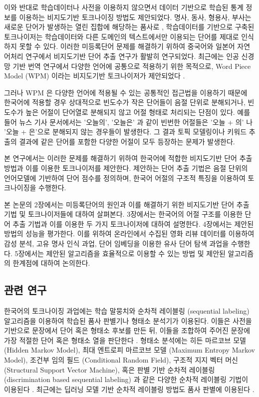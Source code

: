 \documentclass[11pt]{article}
\begin{document}
이와 반대로 학습데이터나 사전을 이용하지 않으면서 데이터 기반으로 학습된 통계 정보를 이용하는 비지도기반 토크나이징 방법도 제안되었다.
명사, 동사, 형용사, 부사는 새로운 단어가 발생하는 열린 집합에 해당하는 품사로 \citep{jurafsky2000speech}, 학습데이터를 기반으로 구축된 토크나이저는 학습데이터와 다른 도메인의 텍스트에서만 이용되는 단어를 제대로 인식하지 못할 수 있다.
이러한 미등록단어 문제를 해결하기 위하여 중국어와 일본어 자연어처리 연구에서 비지도기반 단어 추출 연구가 활발히 연구되었다.
최근에는 인공 신경망 기반 번역 연구에서 다양한 언어에 공통으로 적용하기 위한 목적으로, Word Piece Model (WPM) 이라는 비지도기반 토크나이저가 제안되었다 \citep{sennrich2015neural}.

그러나 WPM 은 다양한 언어에 적용될 수 있는 공통적인 접근법을 이용하기 때문에 한국어에 적용할 경우 상대적으로 빈도수가 작은 단어들이 음절 단위로 분해되거나, 빈도수가 높은 어절이 단어열로 분해되지 않고 어절 형태로 처리되는 단점이 있다.
예를 들어 뉴스 기사 문서에서는 '오늘의', '오늘은' 과 같이 빈번한 어절들은 '오늘 + 의' 나 '오늘 + 은'으로 분해되지 않는 경우들이 발생한다.
그 결과 토픽 모델링이나 키워드 추출의 결과에 같은 단어를 포함한 다양한 어절이 모두 등장하는 문제가 발생한다.

본 연구에서는 이러한 문제를 해결하기 위하여 한국어에 적합한 비지도기반 단어 추출 방법과 이를 이용한 토크나이저를 제안한다.
제안하는 단어 추출 기법은 음절 단위의 언어모델에 기반하여 단어 점수를 정의하며, 한국어 어절의 구조적 특징을 이용하여 토크나이징을 수행한다.

본 논문의 2장에서는 미등록단어의 원인과 이를 해결하기 위한 비지도기반 단어 추출 기법 및 토크나이저들에 대하여 살펴본다.
3장에서는 한국어의 어절 구조를 이용한 단어 추출 기법과 이를 이용한 두 가지 토크나이저에 대하여 설명한다.
4장에서는 제안된 방법의 성능을 평가한다.
이를 위하여 온라인에서 수집된 영화 리뷰 데이터를 이용하여 감성 분석, 고유 명사 인식 과업, 단어 임베딩을 이용한 유사 단어 탐색 과업을 수행한다.
5장에서는 제안된 알고리즘을 효율적으로 이용할 수 있는 방법 및 제안된 알고리즘의 한계점에 대하여 논의한다.

\subsection{관련 연구}

한국어의 토크나이징 과업에는 학습 말뭉치와 순차적 레이블링 (sequential labeling) 알고리즘을 이용하여 학습된 품사 판별기나 형태소 분석기가 이용된다. \citep{konlpy,shim2007made}
이들은 사전을 기반으로 문장에서 단어 혹은 형태소 후보를 만든 뒤, 이들을 조합하여 주어진 문장에 가장 적절한 단어 혹은 형태소 열을 판단한다 \citep{brants2000tnt}.
형태소 분석에는 히든 마르코브 모델 (Hidden Markov Model), 최대 엔트로피 마르코브 모델 (Maximum Entropy Markov Model),  조건부 임의 필드 (Conditional Random Field), 구조적 지지 벡터 머신 (Structural Support Vector Machine), 혹은 판별 기반 순차적 레이블링 (discrimination based sequential labeling) 과 같은 다양한 순차적 레이블링 기법이 이용된다 \citep{krogh1994hidden, mccallum2000maximum, kudo2004applying, taskar2004max, tsochantaridis2005large, bohnet2012transition, na2012crfs}.
최근에는 딥러닝 모델 기반 순차적 레이블링 방법도 품사 판별에 이용된다 \citep{zheng2013deep, collobert2011natural}.
\end{document}
